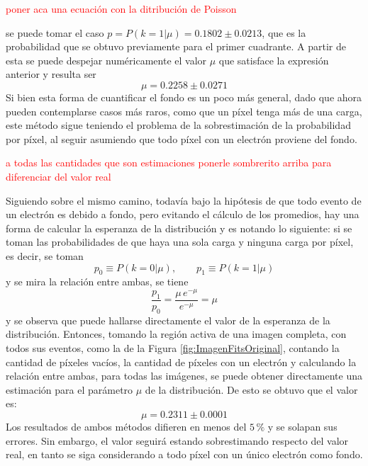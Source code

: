 \textcolor{red}{poner aca una ecuación con la ditribución de Poisson}

se puede tomar el caso $p = P(k = 1 | \mu) = 0.1802 \pm 0.0213$, que es la probabilidad que se obtuvo previamente para el primer cuadrante. A partir de esta se puede despejar numéricamente el valor $\mu$ que satisface la expresión anterior y resulta ser
\begin{equation*}
    \mu = 0.2258 \pm 0.0271
\end{equation*}
Si bien esta forma de cuantificar el fondo es un poco más general, dado que ahora pueden contemplarse casos más raros, como que un píxel tenga más de una carga, este método sigue teniendo el problema de la sobrestimación de la probabilidad por píxel, al seguir asumiendo que todo píxel con un electrón proviene del fondo.

\textcolor{red}{a todas las cantidades que son estimaciones ponerle sombrerito arriba para diferenciar del valor real}

Siguiendo sobre el mismo camino, todavía bajo la hipótesis de que todo evento de un electrón es debido a fondo, pero evitando el cálculo de los promedios, hay una forma de calcular la esperanza de la distribución y es notando lo siguiente: si se toman las probabilidades de que haya una sola carga y ninguna carga por píxel, es decir, se toman
\begin{equation*}
    p_{0} \equiv P(k = 0 | \mu),
    \quad
    \quad
    p_{1} \equiv P(k = 1 | \mu)
\end{equation*}
y se mira la relación entre ambas, se tiene
\begin{equation*}
    \frac{p_{1}}{p_{0}} = \frac{\mu\,e^{-\mu}}{e^{-\mu}} = \mu
\end{equation*}
y se observa que puede hallarse directamente el valor de la esperanza de la distribución. Entonces, tomando la región activa de una imagen completa, con todos sus eventos, como la de la Figura \ref{fig:ImagenFitsOriginal}, contando la cantidad de píxeles vacíos, la cantidad de píxeles con un electrón y calculando la relación entre ambas, para todas las imágenes, se puede obtener directamente una estimación para el parámetro $\mu$ de la distribución. De esto se obtuvo que el valor es:
\begin{equation*}
    \mu = 0.2311 \pm 0.0001
\end{equation*}
Los resultados de ambos métodos difieren en menos del $5\,\%$ y se solapan sus errores. 
Sin embargo, el valor seguirá estando sobrestimando respecto del valor real, en tanto se siga considerando a todo píxel con un único electrón como fondo.

